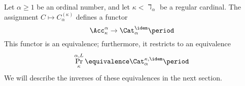 \begin{nul}%
	\label{nul:thetafromAcctoCat}
	Let $ \alpha \geq 1 $ be an ordinal number,
	and let $ \kappa < \daleth_{\alpha} $ be a regular cardinal.
	The assignment $ C \mapsto C^{(\kappa)}_{\alpha} $
	defines a functor
	\[ \Acc_{\kappa}^{\alpha} \to \Cat^{\idem}_{\alpha} \period \]
	This functor is an equivalence;
	furthermore, it restricts to an equivalence
	\[
		\Pr^{\alpha,L}_{\kappa} \equivalence
		\Cat^{\kappa,\idem}_{\alpha} \period
	\]
	We will describe the inverses of these equivalences in the next section.
\end{nul}


